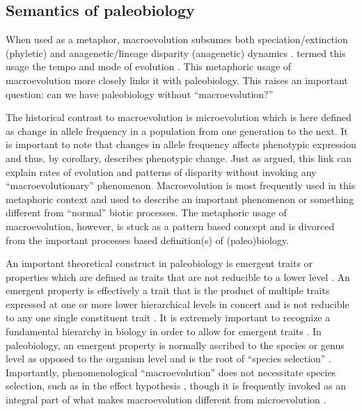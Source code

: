 \documentclass[12pt,letterpaper]{article}
\begin{document}
\subsection{Semantics of paleobiology}
When used as a metaphor, macroevolution subsumes both speciation/extinction (phyletic) and anagenetic/lineage disparity (anagenetic) dynamics \citep{Foote2007b}. \citet{Simpson1944} termed this usage the tempo and mode of evolution \citep{Simpson1944}. This metaphoric usage of macroevolution more closely links it with paleobiology. This raises an important question: can we have paleobiology without ``macroevolution?''

The historical contrast to macroevolution is microevolution \citep{Simpson1944,Foote2007b} which is here defined as change in allele frequency in a population from one generation to the next. It is important to note that changes in allele frequency affects phenotypic expression and thus, by corollary, describes phenotypic change. Just as \citet{Simpson1944} argued, this link can explain rates of evolution and patterns of disparity without invoking any ``macroevolutionary'' phenomenon. Macroevolution is most frequently used in this metaphoric context and used to describe an important phenomenon or something different from ``normal'' biotic processes. The metaphoric usage of macroevolution, however, is stuck as a pattern based concept and is divorced from the important processes based definition(s) of (paleo)biology. 

An important theoretical construct in paleobiology is emergent traits or properties which are defined as traits that are not reducible to a lower level \citep{Grantham1995,Vrba1984,Jablonski2008a,Lloyd1993}. An emergent property is effectively a trait that is the product of multiple traits expressed at one or more lower hierarchical levels in concert and is not reducible to any one single constituent trait \citep{Vrba1984,Jablonski2008a}. It is extremely important to recognize a fundamental hierarchy in biology in order to allow for emergent traits \citep{Vrba1984}. In paleobiology, an emergent property is normally ascribed to the species or genus level as opposed to the organism level and is the root of ``species selection'' \citep{Jablonski2008a,Vrba1984,Lloyd1993,Grantham1995}. Importantly, phenomenological ``macroevolution'' does not necessitate species selection, such as in the effect hypothesis \citep{Vrba1983,Jablonski2008a,Kitchell1985a}, though it is frequently invoked as an integral part of what makes macroevolution different from microevolution \citep{Grantham1995,Jablonski2008}.
\end{document}
